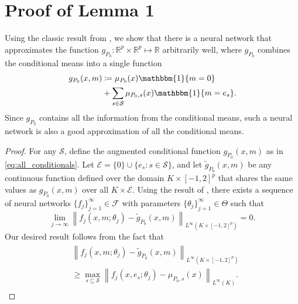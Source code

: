\documentclass{article}
\begin{document}
\printAffiliationsAndNotice{\icmlEqualContribution} %

\section{Proof of Lemma 1}
Using the classic result from \citet{leshno1993multilayer}, we show that there is a neural network that approximates the function $g_{P_0}: \mathbb{R}^p \times \mathbb{R}^p \mapsto \mathbb{R}$ arbitrarily well, where $g_{P_0}$ combines the conditional means into a single function
\begin{align}
\begin{split}
g_{P_0}(x, m) & \coloneqq
\mu_{P_0}(x) \mathbbm{1}\{m = 0\}\\
& + \sum_{s \in \mathcal{S}} \mu_{P_0,s}(x) \mathbbm{1}\{m = e_s\}.
\end{split}
\label{eq:all_conditionals}
\end{align}
Since $g_{P_0}$ contains all the information from the conditional means, such a neural network is also a good approximation of all the conditional means.
\begin{proof}
	For any $\mathcal{S}$, define the augmented conditional function $g_{P_0}(x, m)$ as in \eqref{eq:all_conditionals}.
	Let $\mathcal{E} = \{0\} \cup \{e_s : s \in \mathcal{S}\}$, and let $\tilde{g}_{P_0}(x, m)$ be any continuous function defined over the domain $K \times [-1,2]^{p}$ that shares the same values as $g_{P_0}(x, m)$ over all $K \times \mathcal{E}$.
	Using the result of \citet{leshno1993multilayer}, there exists a sequence of neural networks $\{f_j\}_{j=1}^\infty \in \mathcal{F}$ with parameters $\{\theta_j\}_{j=1}^\infty \in \Theta$ such that
	$$
	\lim_{j\rightarrow\infty}
	\left\|
	f_j \left(x, m; \theta_j \right) - \tilde{g}_{P_0}(x, m)
	\right \|_{L^\infty(K \times [-1,2]^{p})}
	= 0.
	$$
	Our desired result follows from the fact that
	\begin{align*}
	\begin{split}
	&\left\|
	f_j \left(x, m; \theta_j \right) - \tilde{g}_{P_0}(x, m)
	\right \|_{L^\infty(K \times [-1,2]^{p})}\\
	& \ge
	\max_{s \subseteq \mathcal{S}}
	\left\|
	f_j \left(x, e_s; \theta_j \right) - \mu_{P_0, s}(x)
	\right \|_{L^\infty(K)}.
	\end{split}
	\end{align*}
\end{proof}
\end{document}
